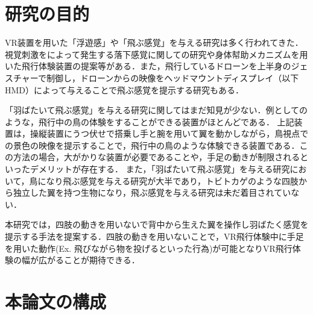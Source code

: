 \section{研究の目的}

        VR装置を用いた「浮遊感」や「飛ぶ感覚」を与える研究は多く行われてきた．視覚刺激をによって発生する落下感覚に関しての研究\cite{奥川夏輝2017VR空間における視覚刺激によって発生する落下感覚の分析}や身体幇助メカニズムを用いた飛行体験装置の提案\cite{鈴木拓馬2014hmd}等がある．また，飛行しているドローンを上半身のジェスチャーで制御し，ドローンからの映像をヘッドマウントディスプレイ（以下HMD）によって与えることで飛ぶ感覚を提示する研究\cite{rognon2018flyjacket}もある．


        「羽ばたいて飛ぶ感覚」を与える研究に関してはまだ知見が少ない．例としてのような，飛行中の鳥の体験をすることができる装置がほとんどである\cite{rheiner2014birdly}\cite{hypersuit}．
        上記装置は，操縦装置にうつ伏せで搭乗し手と腕を用いて翼を動かしながら，鳥視点での景色の映像を提示することで，飛行中の鳥のような体験できる装置である．この方法の場合，大がかりな装置が必要であることや，手足の動きが制限されるといったデメリットが存在する．
        また，「羽ばたいて飛ぶ感覚」を与える研究において，鳥になり飛ぶ感覚を与える研究が大半であり，トビトカゲのような四肢から独立した翼を持つ生物になり，飛ぶ感覚を与える研究は未だ着目されていない．

        本研究では，四肢の動きを用いないで背中から生えた翼を操作し羽ばたく感覚を提示する手法を提案する．四肢の動きを用いないことで，VR飛行体験中に手足を用いた動作(Ex. 飛びながら物を投げるといった行為)が可能となりVR飛行体験の幅が広がることが期待できる．


\section{本論文の構成}

